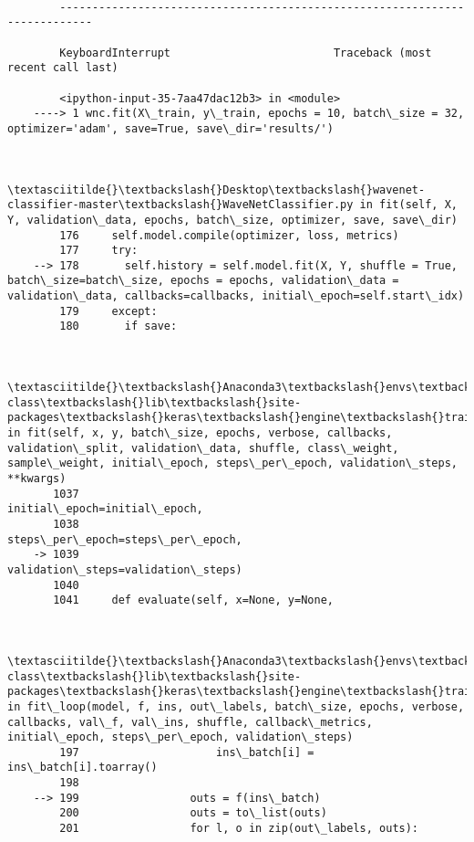\documentclass[11pt]{article}
\begin{document}
    \begin{Verbatim}[commandchars=\\\{\}]

        ---------------------------------------------------------------------------

        KeyboardInterrupt                         Traceback (most recent call last)

        <ipython-input-35-7aa47dac12b3> in <module>
    ----> 1 wnc.fit(X\_train, y\_train, epochs = 10, batch\_size = 32, optimizer='adam', save=True, save\_dir='results/')
    

        \textasciitilde{}\textbackslash{}Desktop\textbackslash{}wavenet-classifier-master\textbackslash{}WaveNetClassifier.py in fit(self, X, Y, validation\_data, epochs, batch\_size, optimizer, save, save\_dir)
        176     self.model.compile(optimizer, loss, metrics)
        177     try:
    --> 178       self.history = self.model.fit(X, Y, shuffle = True, batch\_size=batch\_size, epochs = epochs, validation\_data = validation\_data, callbacks=callbacks, initial\_epoch=self.start\_idx)
        179     except:
        180       if save:
    

        \textasciitilde{}\textbackslash{}Anaconda3\textbackslash{}envs\textbackslash{}wavenet-class\textbackslash{}lib\textbackslash{}site-packages\textbackslash{}keras\textbackslash{}engine\textbackslash{}training.py in fit(self, x, y, batch\_size, epochs, verbose, callbacks, validation\_split, validation\_data, shuffle, class\_weight, sample\_weight, initial\_epoch, steps\_per\_epoch, validation\_steps, **kwargs)
       1037                                         initial\_epoch=initial\_epoch,
       1038                                         steps\_per\_epoch=steps\_per\_epoch,
    -> 1039                                         validation\_steps=validation\_steps)
       1040 
       1041     def evaluate(self, x=None, y=None,
    

        \textasciitilde{}\textbackslash{}Anaconda3\textbackslash{}envs\textbackslash{}wavenet-class\textbackslash{}lib\textbackslash{}site-packages\textbackslash{}keras\textbackslash{}engine\textbackslash{}training\_arrays.py in fit\_loop(model, f, ins, out\_labels, batch\_size, epochs, verbose, callbacks, val\_f, val\_ins, shuffle, callback\_metrics, initial\_epoch, steps\_per\_epoch, validation\_steps)
        197                     ins\_batch[i] = ins\_batch[i].toarray()
        198 
    --> 199                 outs = f(ins\_batch)
        200                 outs = to\_list(outs)
        201                 for l, o in zip(out\_labels, outs):
    


\end{Verbatim}
\end{document}
